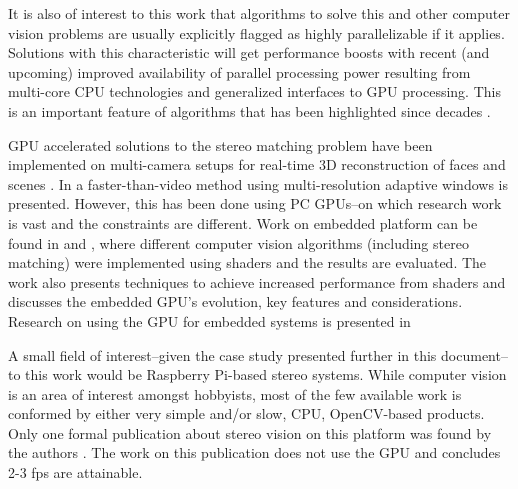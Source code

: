 \documentclass[conference]{IEEEtran}
\begin{document}
It is also of interest to this work that algorithms to solve this and other computer vision problems are usually explicitly flagged as highly parallelizable if it applies. Solutions with this characteristic will get performance boosts with recent (and upcoming) improved availability of parallel processing power resulting from multi-core CPU technologies and generalized interfaces to GPU processing. This is an important feature of algorithms that has been highlighted since decades \cite{baker81}. %

GPU accelerated solutions to the stereo matching problem have been implemented on multi-camera setups for real-time 3D reconstruction of faces \cite{denker11} and scenes \cite{woetzel04}. In \cite{zhao11} a faster-than-video method using multi-resolution adaptive windows is presented. However, this has been done using PC GPUs--on which research work is vast and the constraints are different. Work on embedded platform can be found in \cite{singhal10} and \cite{singhal12}, where different computer vision algorithms (including stereo matching) were implemented using shaders and the results are evaluated. The work also presents techniques to achieve increased performance from shaders and discusses the embedded GPU's evolution, key features and considerations. Research on using the GPU for embedded systems is presented in \cite{hallmans12}  %

A small field of interest--given the case study presented further in this document--to this work would be Raspberry Pi-based stereo systems. While computer vision is an area of interest amongst hobbyists, most of the few available work is conformed by either very simple and/or slow, CPU, OpenCV-based products. Only one formal publication about stereo vision on this platform was found by the authors \cite{neves13}. The work on this publication does not use the GPU and concludes 2-3 fps are attainable. %

\end{document}
